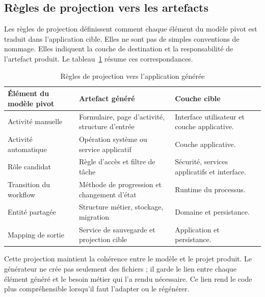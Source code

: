 
\subsection{Règles de projection vers les artefacts}

Les règles de projection définissent comment chaque élément du modèle pivot est traduit dans l'application cible. Elles ne sont pas de simples conventions de nommage. Elles indiquent la couche de destination et la responsabilité de l'artefact produit. Le tableau~\ref{tab:chap3-projection-m2t} résume ces correspondances.

\begin{table}[H]
\centering
\caption{Règles de projection vers l'application générée}
\label{tab:chap3-projection-m2t}
\begin{tabularx}{\textwidth}{p{3.8cm}p{4.8cm}X}
\toprule
\textbf{Élément du modèle pivot} & \textbf{Artefact généré} & \textbf{Couche cible} \\
\midrule
Activité manuelle & Formulaire, page d'activité, structure d'entrée & Interface utilisateur et couche applicative. \\
Activité automatique & Opération système ou service applicatif & Couche applicative. \\
Rôle candidat & Règle d'accès et filtre de tâche & Sécurité, services applicatifs et interface. \\
Transition du workflow & Méthode de progression et changement d'état & Runtime du processus. \\
Entité partagée & Structure métier, stockage, migration & Domaine et persistance. \\
Mapping de sortie & Service de sauvegarde et projection cible & Application et persistance. \\
\bottomrule
\end{tabularx}
\end{table}

Cette projection maintient la cohérence entre le modèle et le projet produit. Le générateur ne crée pas seulement des fichiers ; il garde le lien entre chaque élément généré et le besoin métier qui l'a rendu nécessaire. Ce lien rend le code plus compréhensible lorsqu'il faut l'adapter ou le régénérer.


